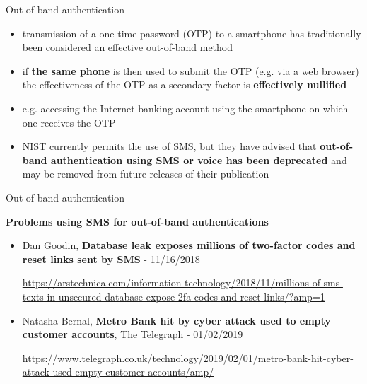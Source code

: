 \documentclass[pdf]{beamer}
\begin{document}
\begin{frame}{Out-of-band authentication}
\begin{itemize}
\item
transmission of a one-time password (OTP) to a smartphone has traditionally been considered an effective out-of-band method

\item
if \textbf{the same phone} is then used to submit the OTP (e.g. via a web browser) the effectiveness of the OTP as a secondary factor is \textbf{effectively nullified}

\item
e.g. accessing the Internet banking account using the smartphone on which one receives the OTP
\newline

\item
NIST currently permits the use of SMS, but they have advised that \textbf{out-of-band authentication using SMS or voice has been deprecated} and may be removed from future releases of their publication
\end{itemize}
\end{frame}



\begin{frame}{Out-of-band authentication}

\textbf{Problems using SMS for out-of-band authentications}

\begin{itemize}
\item
Dan Goodin, \textbf{Database leak exposes millions of two-factor codes and reset links sent by SMS} - 11/16/2018

\url{https://arstechnica.com/information-technology/2018/11/millions-of-sms-texts-in-unsecured-database-expose-2fa-codes-and-reset-links/?amp=1}

\item
Natasha Bernal, \textbf{Metro Bank hit by cyber attack used to empty customer accounts}, The Telegraph  - 01/02/2019

\url{https://www.telegraph.co.uk/technology/2019/02/01/metro-bank-hit-cyber-attack-used-empty-customer-accounts/amp/}

\end{itemize}
\end{frame}
\end{document}
